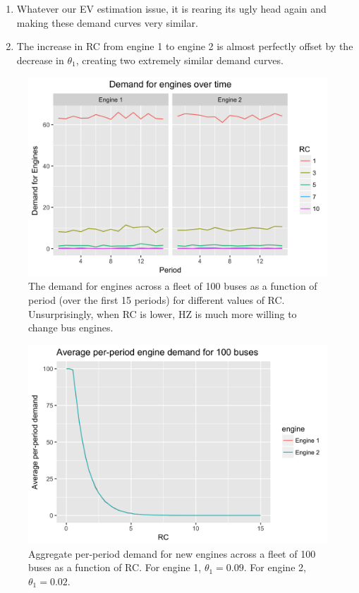 \documentclass[paper=a4, fontsize=11pt]{scrartcl} %
\numberwithin{equation}{section} %
\numberwithin{figure}{section} %
\numberwithin{table}{section} %
\begin{document}
\begin{itemize}
\begin{itemize}
\begin{enumerate}
\item Whatever our EV estimation issue, it is rearing its ugly head again and making these demand curves very similar.
\item The increase in RC from engine 1 to engine 2 is almost perfectly offset by the decrease in $\theta_1$, creating two extremely similar demand curves.
\end{enumerate} 

\begin{figure}[ht!]
\centering
	\includegraphics[scale=.25]{per_period_demand_plot.png}
\caption{The demand for engines across a fleet of 100 buses as a function of period (over the first 15 periods) for different values of RC. Unsurprisingly, when RC is lower, HZ is much more willing to change bus engines.} 
\label{fig:time_demand_rc}
\end{figure} 

\begin{figure}[ht!]
\centering
	\includegraphics[scale=.25]{aggregate_demand_plot.png}
\caption{Aggregate per-period demand for new engines across a fleet of 100 buses as a function of RC. For engine 1, $\theta_1 = 0.09$. For engine 2, $\theta_1 = 0.02$.} 
\label{fig:agg_demand_rc}
\end{figure} 


\end{itemize}
\end{itemize}
\end{document}
